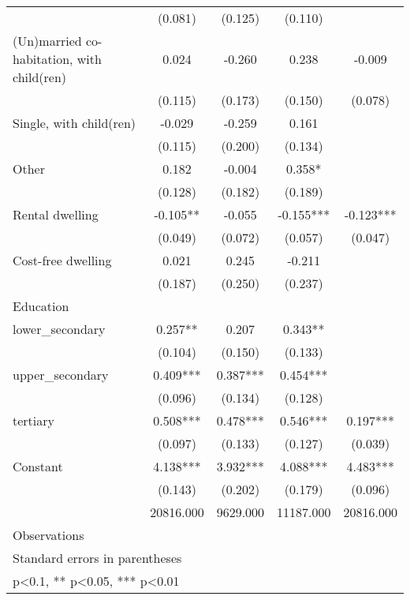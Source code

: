 \begin{table}[htbp]
\begin{tabular}{l*{4}{c}}
                &  (0.081)   &  (0.125)   &  (0.110)   &            \\
(Un)married co-habitation, with child(ren)&    0.024   &   -0.260   &    0.238   &   -0.009   \\
                &  (0.115)   &  (0.173)   &  (0.150)   &  (0.078)   \\
Single, with child(ren)&   -0.029   &   -0.259   &    0.161   &            \\
                &  (0.115)   &  (0.200)   &  (0.134)   &            \\
Other           &    0.182   &   -0.004   &    0.358*  &            \\
                &  (0.128)   &  (0.182)   &  (0.189)   &            \\
Rental dwelling &   -0.105** &   -0.055   &   -0.155***&   -0.123***\\
                &  (0.049)   &  (0.072)   &  (0.057)   &  (0.047)   \\
Cost-free dwelling&    0.021   &    0.245   &   -0.211   &            \\
                &  (0.187)   &  (0.250)   &  (0.237)   &            \\
Education       &            &            &            &            \\
lower\_secondary &    0.257** &    0.207   &    0.343** &            \\
                &  (0.104)   &  (0.150)   &  (0.133)   &            \\
upper\_secondary &    0.409***&    0.387***&    0.454***&            \\
                &  (0.096)   &  (0.134)   &  (0.128)   &            \\
tertiary        &    0.508***&    0.478***&    0.546***&    0.197***\\
                &  (0.097)   &  (0.133)   &  (0.127)   &  (0.039)   \\
Constant        &    4.138***&    3.932***&    4.088***&    4.483***\\
                &  (0.143)   &  (0.202)   &  (0.179)   &  (0.096)   \\
\midrule
\hspace{2mm}    &20816.000   & 9629.000   &11187.000   &20816.000   \\
Observations    &            &            &            &            \\
\bottomrule
\multicolumn{5}{l}{\footnotesize Standard errors in parentheses}\\
\multicolumn{5}{l}{\footnotesize * p<0.1, ** p<0.05, *** p<0.01}\\
\end{tabular}
\end{table}
